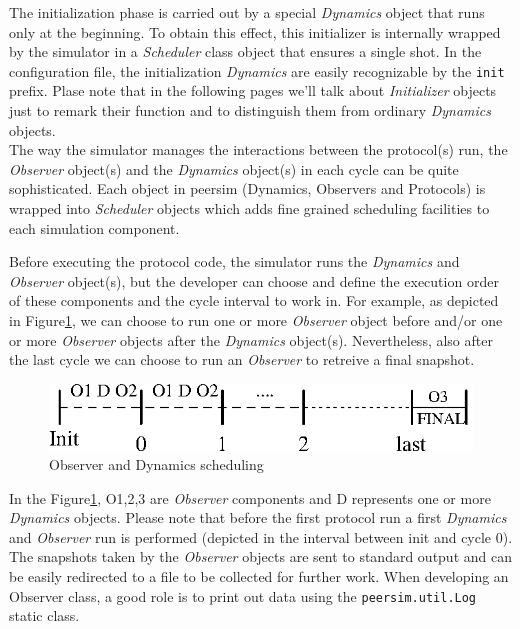 \documentclass[a4paper,11pt]{article}
\begin{document}
The initialization phase is carried out by a special \emph{Dynamics}
object that runs only at the beginning. To obtain this effect, this
initializer is internally wrapped by the simulator in a \emph{Scheduler} 
class object that ensures a single shot. In the configuration file,
the initialization \emph{Dynamics} are easily recognizable by the
\texttt{init} prefix. Plase note that in the following pages we'll
talk about \emph{Initializer} objects just to remark their function and
to distinguish them from ordinary \emph{Dynamics} objects.\\
The way the simulator manages the interactions between the protocol(s)
run, the \emph{Observer} object(s) and the \emph{Dynamics} object(s)
in each cycle can be quite sophisticated. Each object in peersim 
(Dynamics, Observers and Protocols) is wrapped into \emph{Scheduler} 
objects which adds fine grained scheduling facilities to each
simulation component.

Before executing the protocol code, the simulator runs the \emph{Dynamics}
and \emph{Observer} object(s), but the developer can choose and define
the execution order of these components and the cycle interval to
work in. For example, as depicted in Figure\ref{obsfigure}, we can
choose to run one or more \emph{Observer} object before and/or one
or more \emph{Observer} objects after the \emph{Dynamics} object(s).
Nevertheless, also after the last cycle we can choose to run an \emph{Observer}
to retreive a final snapshot.


\begin{figure}
\begin{center}
\includegraphics[scale=1.1]{scheduling.eps}
\end{center}
\caption{Observer and Dynamics scheduling\label{obsfigure}}
\end{figure}


In the Figure\ref{obsfigure}, O1,2,3 are \emph{Observer} components
and D represents one or more \emph{Dynamics} objects. Please note
that before the first protocol run a first \emph{Dynamics} and \emph{Observer}
run is performed (depicted in the interval between init and cycle
0).\\
The snapshots taken by the \emph{Observer} objects are sent to
standard output and can be easily redirected to a file to be collected
for further work. When developing an Observer class, a good role is to print out 
data using the \texttt{peersim.util.Log} static class.
\end{document}
